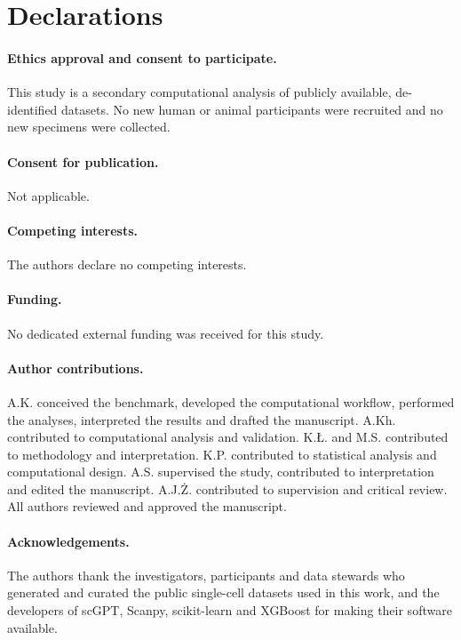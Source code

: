 \section*{Declarations}

\paragraph{Ethics approval and consent to participate.} This study is a secondary computational analysis of publicly available, de-identified datasets. No new human or animal participants were recruited and no new specimens were collected.

\paragraph{Consent for publication.} Not applicable.

\paragraph{Competing interests.} The authors declare no competing interests.

\paragraph{Funding.} No dedicated external funding was received for this study.

\paragraph{Author contributions.} A.K. conceived the benchmark, developed the computational workflow, performed the analyses, interpreted the results and drafted the manuscript. A.Kh. contributed to computational analysis and validation. K.{\L}. and M.S. contributed to methodology and interpretation. K.P. contributed to statistical analysis and computational design. A.S. supervised the study, contributed to interpretation and edited the manuscript. A.J.{\.Z}. contributed to supervision and critical review. All authors reviewed and approved the manuscript.

\paragraph{Acknowledgements.} The authors thank the investigators, participants and data stewards who generated and curated the public single-cell datasets used in this work, and the developers of scGPT, Scanpy, scikit-learn and XGBoost for making their software available.
